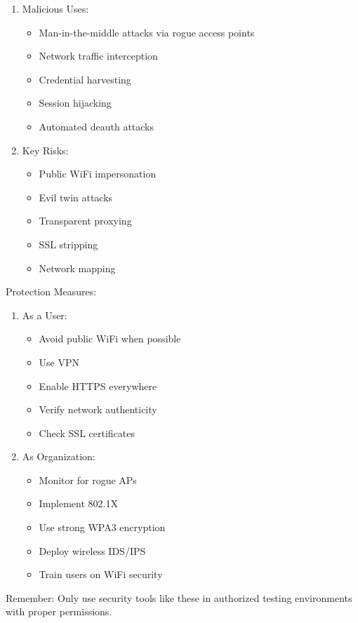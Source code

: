 \begin{enumerate}
  \item Malicious Uses:
  \begin{itemize}
    \tightlist
		\item Man-in-the-middle attacks via rogue access points
		\item Network traffic interception 
		\item Credential harvesting
		\item Session hijacking
		\item Automated deauth attacks
  \end{itemize}

  \item Key Risks:
  \begin{itemize}
    \tightlist
		\item Public WiFi impersonation
		\item Evil twin attacks
		\item Transparent proxying
		\item SSL stripping
		\item Network mapping
  \end{itemize}
\end{enumerate}

Protection Measures:
\begin{enumerate}
  \item As a User:
  \begin{itemize}
    \tightlist
		\item Avoid public WiFi when possible
		\item Use VPN
		\item Enable HTTPS everywhere
		\item Verify network authenticity
		\item Check SSL certificates
  \end{itemize}

  \item As Organization:
  \begin{itemize}
    \tightlist
		\item Monitor for rogue APs
		\item Implement 802.1X
		\item Use strong WPA3 encryption
		\item Deploy wireless IDS/IPS
		\item Train users on WiFi security
  \end{itemize}
\end{enumerate}
Remember: Only use security tools like these in authorized testing environments with proper permissions.

